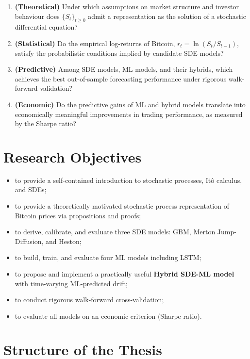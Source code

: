 \documentclass[12pt, a4paper, oneside]{report}
\theoremstyle{plain}
\theoremstyle{definition}
\theoremstyle{remark}
\begin{document}
\begin{enumerate}[leftmargin=1.25cm, label=\arabic*.]
  \item \textbf{(Theoretical)}  Under which assumptions on market structure and
    investor behaviour does $\{S_t\}_{t \geq 0}$ admit a representation as the
    solution of a stochastic differential equation?
  \item \textbf{(Statistical)}  Do the empirical log-returns of Bitcoin,
    $r_t = \ln(S_t / S_{t-1})$, satisfy the probabilistic conditions implied by
    candidate SDE models?
  \item \textbf{(Predictive)}  Among SDE models, ML models, and their hybrids,
    which achieves the best out-of-sample forecasting performance under
    rigorous walk-forward validation?
  \item \textbf{(Economic)}  Do the predictive gains of ML and hybrid models
    translate into economically meaningful improvements in trading performance,
    as measured by the Sharpe ratio?
\end{enumerate}

\section*{Research Objectives}

\begin{itemize}[leftmargin=1.25cm]
  \item to provide a self-contained introduction to stochastic processes,
    It\^{o} calculus, and SDEs;
  \item to provide a theoretically motivated stochastic process representation of Bitcoin
    prices via propositions and proofs;
  \item to derive, calibrate, and evaluate three SDE models: GBM, Merton
    Jump-Diffusion, and Heston;
  \item to build, train, and evaluate four ML models including LSTM;
  \item to propose and implement a practically useful \textbf{Hybrid SDE-ML model} with
    time-varying ML-predicted drift;
  \item to conduct rigorous walk-forward cross-validation;
  \item to evaluate all models on an economic criterion (Sharpe ratio).
\end{itemize}

\section*{Structure of the Thesis}
\end{document}
